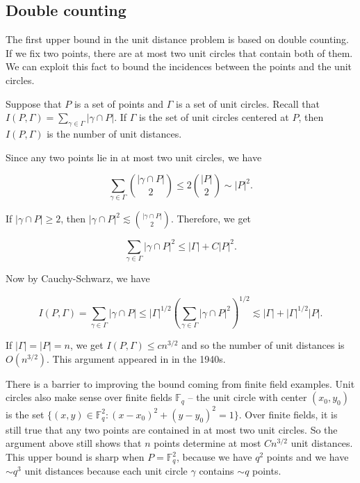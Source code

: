 \documentclass{amsart}
\newcommand{\FF}{\mathbb{F}}
\begin{document}
\subsection{Double counting} \label{subsecdoublecount}

The first upper bound in the unit distance problem is based on double counting.   If we fix two points,  there are at most two unit circles that contain both of them.   We can exploit this fact to bound the incidences between the points and the unit circles.

 Suppose that $P$ is a set of points and $\Gamma$ is a set of unit circles.   Recall that $I(P, \Gamma) = \sum_{\gamma \in \Gamma} |\gamma \cap P|$.   If $\Gamma$ is the set of unit circles centered at $P$,  then $I(P,\Gamma)$ is the number of unit distances.
 
 Since any two points lie in at most two unit circles,  we have
 
 $$ \sum_{\gamma \in \Gamma} { |\gamma \cap P| \choose 2} \le 2 { |P| \choose 2} \sim |P|^2. $$
 
 If $|\gamma \cap P| \ge 2$,  then $|\gamma \cap P|^2 \lesssim { |\gamma \cap P| \choose 2}$.   Therefore,  we get
 
 $$ \sum_{\gamma \in \Gamma}  |\gamma \cap P|^2 \le |\Gamma| + C |P|^2.  $$
 
 Now by Cauchy-Schwarz,  we have
 
 \begin{equation} \label{doubcount} I(P, \Gamma) = \sum_{\gamma \in \Gamma} |\gamma \cap P| \le |\Gamma|^{1/2} \left( \sum_{\gamma \in \Gamma} |\gamma \cap P|^2 \right)^{1/2} \lesssim | \Gamma|  +  |\Gamma|^{1/2} |P|.  \end{equation}
 
 If $|\Gamma| = |P| = n$,  we get $I(P,\Gamma) \le c n^{3/2}$ and so the number of unit distances is $O(n^{3/2})$.   This argument appeared in \cite{Erd} in the 1940s.
 
 There is a barrier to improving the bound coming from finite field examples.   Unit circles also make sense over finite fields $\FF_q$ -- the unit circle with center $(x_0, y_0)$ is the set $\{ (x,y) \in \FF_q^2: (x-x_0)^2 + (y-y_0)^2 = 1 \}$.   Over finite fields, it is still true that any two points are contained in at most two unit circles.  So the argument above still shows that $n$ points determine at most $C n^{3/2}$ unit distances.   This upper bound is sharp when $P = \FF_q^2$,  because we have $q^2$ points and we have $\sim q^3$ unit distances because each unit circle $\gamma$ contains $\sim q$ points.   
\end{document}
